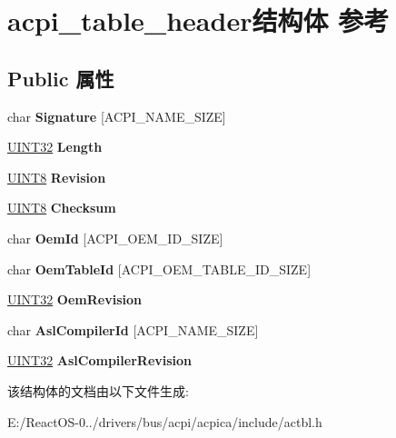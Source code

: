 \hypertarget{structacpi__table__header}{}\section{acpi\+\_\+table\+\_\+header结构体 参考}
\label{structacpi__table__header}
\subsection*{Public 属性}
\begin{DoxyCompactItemize}
\item 
\mbox{\label{structacpi__table__header_a453579f3d80ea8a8ce0426d802ef8083}} 
char {\bfseries Signature} \mbox{[}A\+C\+P\+I\+\_\+\+N\+A\+M\+E\+\_\+\+S\+I\+ZE\mbox{]}
\item 
\mbox{\label{structacpi__table__header_aeb3dbcce0ceac347fc75de67a3070c55}} 
\hyperlink{_processor_bind_8h_ae1e6edbbc26d6fbc71a90190d0266018}{U\+I\+N\+T32} {\bfseries Length}
\item 
\mbox{\label{structacpi__table__header_a957d64abbbdbb9e4a53eaf545dfa176a}} 
\hyperlink{_processor_bind_8h_ab27e9918b538ce9d8ca692479b375b6a}{U\+I\+N\+T8} {\bfseries Revision}
\item 
\mbox{\label{structacpi__table__header_a74c8f36813492fc2e5422db552155650}} 
\hyperlink{_processor_bind_8h_ab27e9918b538ce9d8ca692479b375b6a}{U\+I\+N\+T8} {\bfseries Checksum}
\item 
\mbox{\label{structacpi__table__header_acd9cbbbcb14323bf7af1f2bf692b0fcb}} 
char {\bfseries Oem\+Id} \mbox{[}A\+C\+P\+I\+\_\+\+O\+E\+M\+\_\+\+I\+D\+\_\+\+S\+I\+ZE\mbox{]}
\item 
\mbox{\label{structacpi__table__header_a99c80b1cc997acfbeb908116d91392b9}} 
char {\bfseries Oem\+Table\+Id} \mbox{[}A\+C\+P\+I\+\_\+\+O\+E\+M\+\_\+\+T\+A\+B\+L\+E\+\_\+\+I\+D\+\_\+\+S\+I\+ZE\mbox{]}
\item 
\mbox{\label{structacpi__table__header_a4ea15009bf5bea4ca63b8b596f5c0dcf}} 
\hyperlink{_processor_bind_8h_ae1e6edbbc26d6fbc71a90190d0266018}{U\+I\+N\+T32} {\bfseries Oem\+Revision}
\item 
\mbox{\label{structacpi__table__header_ac9227fcc327bf54d56e9fbecd5e4e2ed}} 
char {\bfseries Asl\+Compiler\+Id} \mbox{[}A\+C\+P\+I\+\_\+\+N\+A\+M\+E\+\_\+\+S\+I\+ZE\mbox{]}
\item 
\mbox{\label{structacpi__table__header_ad811e1b3d05ef8ea101b53669539423a}} 
\hyperlink{_processor_bind_8h_ae1e6edbbc26d6fbc71a90190d0266018}{U\+I\+N\+T32} {\bfseries Asl\+Compiler\+Revision}
\end{DoxyCompactItemize}


该结构体的文档由以下文件生成\+:\begin{DoxyCompactItemize}
\item 
E\+:/\+React\+O\+S-\/0../drivers/bus/acpi/acpica/include/actbl.\+h\end{DoxyCompactItemize}
